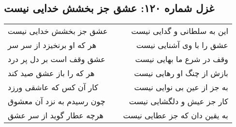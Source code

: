 \begin{center}
\section*{غزل شماره ۱۲۰: عشق جز بخشش خدایی نیست}
\label{sec:120}
\begin{longtable}{l p{0.5cm} r}
عشق جز بخشش خدایی نیست
&&
این به سلطانی و گدایی نیست
\\
هر که او برنخیزد از سر سر
&&
عشق را با وی آشنایی نیست
\\
عشق وقف است بر دل پر درد
&&
وقف در شرع ما بهایی نیست
\\
هر که را باز عشق صید کند
&&
بازش از چنگ او رهایی نیست
\\
کار آن کس که عاشقی ورزد
&&
به جز از عین بی نوایی نیست
\\
چون رسیدم به نزد آن معشوق
&&
کار جز عیش و دلگشایی نیست
\\
هرچه عطار گوید از سر عشق
&&
به یقین دان که جز عطایی نیست
\\
\end{longtable}
\end{center}
